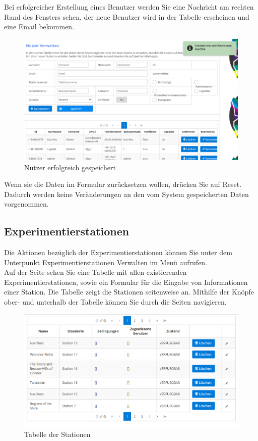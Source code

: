 \documentclass[enabledeprecatedfontcommands,fontsize=12pt,paper=a4,twoside]{scrartcl}
\begin{document}
Bei erfolgreicher Erstellung eines Benutzer werden Sie eine Nachricht am rechten Rand des Fensters sehen, der neue Benutzer wird in der Tabelle erscheinen und eine Email bekommen. 
\begin{figure}[h!]
\begin{center}
 \includegraphics[width=\textwidth]{screenshots/admin/nutzererfolgreich.png}
  \caption{Nutzer erfolgreich gespeichert}
  \label{fig:boat1}
\end{center}
\end{figure}
Wenn sie die Daten im Formular zurücksetzen wollen, drücken Sie auf Reset. Dadurch werden keine Veränderungen an den vom System gespeicherten Daten vorgenommen. \\ 

\subsection{Experimentierstationen}
Die Aktionen bezüglich der Experimentierstationen können Sie unter dem Unterpunkt Experimentierstationen Verwalten im Menü aufrufen. \\
Auf der Seite sehen Sie eine Tabelle mit allen existierenden Experimentierstationen, sowie ein Formular für die Eingabe von Informationen einer Station. Die Tabelle zeigt die Stationen seitenweise an. Mithilfe der Knöpfe ober- und unterhalb der Tabelle können Sie durch die Seiten navigieren. \\

\begin{figure}[h!]
\begin{center}
 \includegraphics[width=\textwidth]{screenshots/admin/stationtabelle.png}
  \caption{Tabelle der Stationen}
  \label{fig:boat2}
\end{center}
\end{figure}
\end{document}
